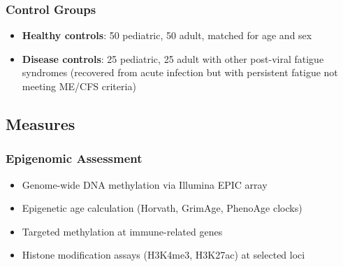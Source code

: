 \subsubsection{Control Groups}
\begin{itemize}
    \item \textbf{Healthy controls}: 50 pediatric, 50 adult, matched for age and sex
    \item \textbf{Disease controls}: 25 pediatric, 25 adult with other post-viral fatigue syndromes (recovered from acute infection but with persistent fatigue not meeting ME/CFS criteria)
\end{itemize}

\subsection{Measures}

\subsubsection{Epigenomic Assessment}
\begin{itemize}
    \item Genome-wide DNA methylation via Illumina EPIC array
    \item Epigenetic age calculation (Horvath, GrimAge, PhenoAge clocks)
    \item Targeted methylation at immune-related genes
    \item Histone modification assays (H3K4me3, H3K27ac) at selected loci
\end{itemize}

